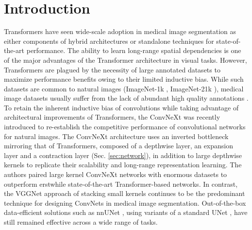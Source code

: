 \documentclass[runningheads]{llncs}
\begin{document}
\section{Introduction}

Transformers \cite{vaswani2017attention,dosovitskiy2020image,liu2021swin} have seen wide-scale adoption in medical image segmentation as either components of hybrid architectures \cite{chen2021transunet,hatamizadeh2022unetr,xie2021cotr,cao2021swin,hatamizadeh2022swin,wang2021transbts} or standalone techniques \cite{zhou2021nnformer,peiris2022robust,karimi2021convolution} for state-of-the-art performance. The ability to learn long-range spatial dependencies is one of the major advantages of the Transformer architecture in visual tasks. However, Transformers are plagued by the necessity of large annotated datasets to maximize performance benefits owing to their limited inductive bias. While such datasets are common to natural images (ImageNet-1k \cite{deng2009imagenet}, ImageNet-21k \cite{ridnik2021imagenet}), medical image datasets usually suffer from the lack of abundant high quality annotations \cite{litjens2017survey}. To retain the inherent inductive bias of convolutions while taking advantage of architectural improvements of Transformers, the ConvNeXt \cite{liu2022convnet} was recently introduced to re-establish the competitive performance of convolutional networks for natural images. The ConvNeXt architecture uses an inverted bottleneck mirroring that of Transformers, composed of a depthwise layer, an expansion layer and a contraction layer (Sec. \ref{sec:network}), in addition to large depthwise kernels to replicate their scalability and long-range representation learning. The authors paired large kernel ConvNeXt networks with enormous datasets to outperform erstwhile state-of-the-art Transformer-based networks.
In contrast, the VGGNet \cite{simonyan2014very} approach of stacking small kernels continues to be the predominant technique for designing ConvNets in medical image segmentation. Out-of-the-box data-efficient solutions such as nnUNet \cite{isensee2021nnu}, using variants of a standard UNet \cite{cciccek20163d}, have still remained effective across a wide range of tasks. 
\end{document}
